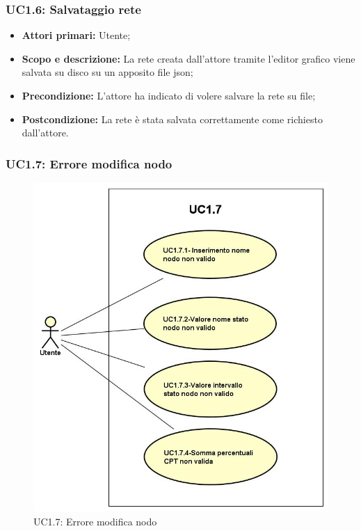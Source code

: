 \subsubsection{UC1.6: Salvataggio rete} 
\begin{itemize} 
	\item{\textbf{Attori primari:} Utente;} 
	\item{\textbf{Scopo e descrizione:} La rete creata dall'attore tramite l'editor grafico viene salvata su disco su un apposito file json;} 
	\item{\textbf{Precondizione:} L'attore ha indicato di volere salvare la rete su file;} 
	\item{\textbf{Postcondizione:} La rete è stata salvata correttamente come richiesto dall'attore.} 
\end{itemize} 
\subsubsection{UC1.7: Errore modifica nodo}
\begin{figure} [H]
	\centering
	\includegraphics[scale=0.45]{Img/UC1-7} 
	\caption{UC1.7: Errore modifica nodo} \label{} 
\end{figure}
